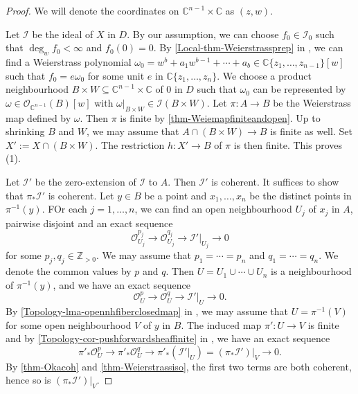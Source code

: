 \begin{proof}
    We will denote the coordinates on $\mathbb{C}^{n-1}\times \mathbb{C}$ as $(z,w)$.

    Let $\mathcal{I}$ be the ideal of $X$ in $D$. By our assumption, we can choose $f_0\in \mathcal{I}_0$ such that $\deg_w f_0<\infty$ and $f_0(0)=0$. By \cref{Local-thm-Weierstrassprep} in , we can find a Weierstrass polynomial $\omega_0=w^b+a_1w^{b-1}+\cdots+a_b\in \mathbb{C}\{ z_1,\ldots,z_{n-1} \}[w]$ such that $f_0=e\omega_0$ for some unit $e$ in $\mathbb{C}\{ z_1,\ldots,z_{n} \}$. We choose a product neighbourhood $B\times W\subseteq \mathbb{C}^{n-1}\times \mathbb{C}$ of $0$ in $D$ such that $\omega_0$ can be represented by $\omega\in \mathcal{O}_{\mathbb{C}^{n-1}}(B)[w]$ with $\omega|_{B\times W}\in \mathcal{I}(B\times W)$. Let $\pi:A\rightarrow B$ be the Weierstrass map defined by $\omega$. Then $\pi$ is finite by \cref{thm-Weiemapfiniteandopen}. 
    Up to shrinking $B$ and $W$, we may assume that $A\cap (B\times W)\rightarrow B$ is finite as well. Set $X':=X\cap (B\times W)$. The restriction $h:X'\rightarrow B$ of $\pi$ is then finite. This proves (1).

    Let $\mathcal{I}'$ be the zero-extension of $\mathcal{I}$ to $A$. Then $\mathcal{I}'$ is coherent. It suffices to show that $\pi_*\mathcal{I}'$ is coherent. Let $y\in B$ be a point and $x_1,\ldots,x_n$ be the distinct points in $\pi^{-1}(y)$.  FOr each $j=1,\ldots,n$, we can find an open neighbourhood $U_j$ of $x_j$ in $A$, pairwise disjoint and an exact sequence 
    \[
        \mathcal{O}_{U_j}^{p_j}\rightarrow \mathcal{O}_{U_j}^{q_j}\rightarrow \mathcal{I}'|_{U_j}\rightarrow 0
    \]
    for some $p_j,q_j\in \mathbb{Z}_{>0}$.  We may assume that $p_1=\cdots=p_n$ and $q_1=\cdots=q_n$. We denote the common values by $p$ and $q$. Then $U=U_1\cup\cdots\cup U_n$ is a neighbourhood of $\pi^{-1}(y)$, and we have an exact sequence 
    \[
        \mathcal{O}_{U}^{p}\rightarrow \mathcal{O}_{U}^{q}\rightarrow \mathcal{I}'|_{U}\rightarrow 0.
    \]
    By \cref{Topology-lma-opennhfiberclosedmap} in , we may assume that $U=\pi^{-1}(V)$ for some open neighbourhood $V$ of $y$ in $B$. The induced map $\pi':U\rightarrow V$ is finite and by \cref{Topology-cor-pushforwardsheaffinite} in , we have an exact sequence
    \[
        \pi'_*\mathcal{O}_{U}^{p}\rightarrow \pi'_*\mathcal{O}_{U}^{q}\rightarrow \pi'_*\left(\mathcal{I}'|_{U}\right)=(\pi_*\mathcal{I}')|_V\rightarrow 0.
    \]
    By \cref{thm-Okacoh} and \cref{thm-Weierstrassiso}, the first two terms are both coherent, hence so is $(\pi_*\mathcal{I}')|_V$.
\end{proof}


